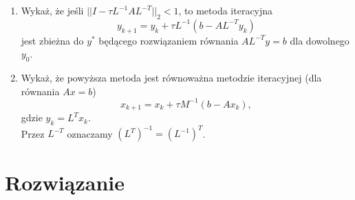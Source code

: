 \documentclass[a4paper]{article}
\begin{document}
      \begin{enumerate}[label=(\alph*)]
         \item
            Wykaż, że jeśli $|| I - \tau L^{-1} A L^{-T} ||_{2} < 1$, to metoda iteracyjna
            \[
               y_{k+1} = y_{k} + \tau L^{-1} (b - A L^{-T} y_{k})
            \]
            jest zbieżna do $y^{*}$ będącego rozwiązaniem równania $A L^{-T} y = b$ dla dowolnego $y_{0}$.

         \item
            Wykaż, że powyższa metoda jest równoważna metodzie iteracyjnej (dla równania $A x = b$)
            \[
               x_{k + 1} = x_{k} + \tau M^{-1} (b - A x_{k}),
            \]
            gdzie $y_{k} = L^{T} x_{k}$. \\

            Przez $L^{-T}$ oznaczamy $(L^{T})^{-1} = (L^{-1})^{T}$.
      \end{enumerate}


   \section*{\large Rozwiązanie}
\end{document}

